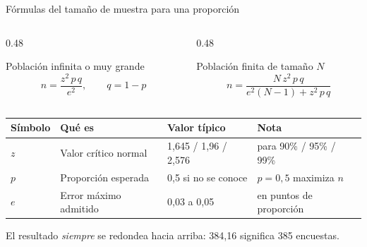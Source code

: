 \documentclass[aspectratio=169,10pt]{beamer}
\begin{document}
\begin{frame}{Fórmulas del tamaño de muestra para una proporción}
  \begin{columns}[T,onlytextwidth]
    \begin{column}{0.48\textwidth}
      \begin{block}{Población infinita o muy grande}
        \[ n=\frac{z^{2}\,p\,q}{e^{2}},\qquad q=1-p \]
      \end{block}
    \end{column}
    \begin{column}{0.48\textwidth}
      \begin{block}{Población finita de tamaño $N$}
        \[ n=\frac{N\,z^{2}\,p\,q}{e^{2}(N-1)+z^{2}\,p\,q} \]
      \end{block}
    \end{column}
  \end{columns}

  \vspace{0.25cm}
  \footnotesize
  \begin{center}
  \begin{tabular}{@{}llll@{}}
    \toprule
    \textbf{Símbolo} & \textbf{Qué es} & \textbf{Valor típico} & \textbf{Nota} \\
    \midrule
    $z$ & Valor crítico normal & 1{,}645 / 1{,}96 / 2{,}576 & para 90\% /
      95\% / 99\% \\
    $p$ & Proporción esperada & 0{,}5 si no se conoce & $p=0{,}5$ maximiza $n$ \\
    $e$ & Error máximo admitido & 0{,}03 a 0{,}05 & en puntos de proporción \\
    \bottomrule
  \end{tabular}
  \end{center}

  \vspace{0.15cm}
  {\scriptsize\color{uniGris} El resultado \emph{siempre} se redondea hacia
  arriba: 384{,}16 significa 385 encuestas.}
\end{frame}
\end{document}
